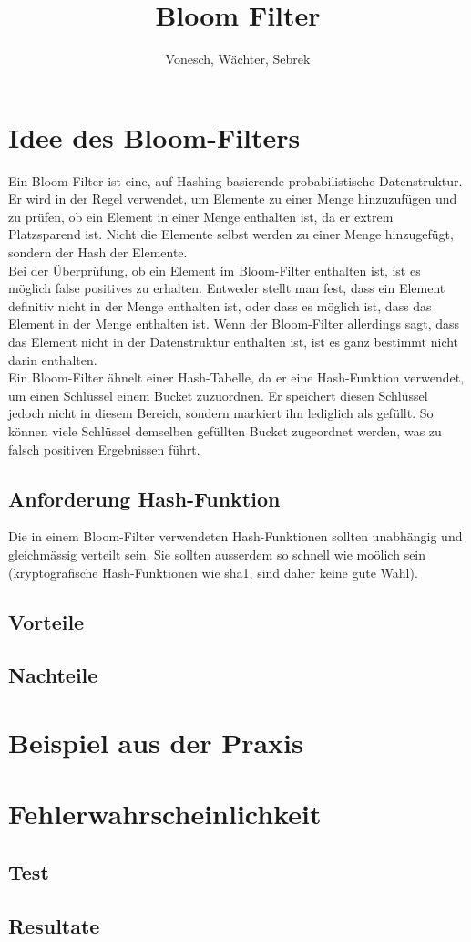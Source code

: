 \documentclass[11pt]{article}
\title{Bloom Filter}
\author{Vonesch, Wächter, Sebrek}
\begin{document}
    \maketitle

    \section{Idee des Bloom-Filters}

    Ein Bloom-Filter ist eine, auf Hashing basierende probabilistische Datenstruktur.
    Er wird in der Regel verwendet, um Elemente zu einer Menge hinzuzuf{\"u}gen und zu pr{\"u}fen, ob ein Element in einer Menge enthalten ist, da er extrem Platzsparend ist.
    Nicht die Elemente selbst werden zu einer Menge hinzugef{\"u}gt, sondern der Hash der Elemente. \\

    Bei der {\"U}berpr{\"u}fung, ob ein Element im Bloom-Filter enthalten ist, ist es m{\"o}glich false positives zu erhalten.
    Entweder stellt man fest, dass ein Element definitiv nicht in der Menge enthalten ist, oder dass es m{\"o}glich ist, dass das Element in der Menge enthalten ist.
    Wenn der Bloom-Filter allerdings sagt, dass das Element nicht in der Datenstruktur enthalten ist, ist es ganz bestimmt nicht darin enthalten.\\

    Ein Bloom-Filter {\"a}hnelt einer Hash-Tabelle, da er eine Hash-Funktion verwendet, um einen Schl{\"u}ssel einem Bucket zuzuordnen.
    Er speichert diesen Schl{\"u}ssel jedoch nicht in diesem Bereich, sondern markiert ihn lediglich als gef{\"u}llt.
    So k{\"o}nnen viele Schl{\"u}ssel demselben gef{\"u}llten Bucket zugeordnet werden, was zu falsch positiven Ergebnissen f{\"u}hrt.

    \subsection{Anforderung Hash-Funktion}
    Die in einem Bloom-Filter verwendeten Hash-Funktionen sollten unabh{\"a}ngig und gleichm{\"a}ssig verteilt sein.
    Sie sollten ausserdem so schnell wie mo{\"o}lich sein (kryptografische Hash-Funktionen wie sha1, sind daher keine gute Wahl).

    \subsection{Vorteile}

    \subsection{Nachteile}

    \section{Beispiel aus der Praxis}

    \section{Fehlerwahrscheinlichkeit}

    \subsection{Test}

    \subsection{Resultate}
\end{document}
